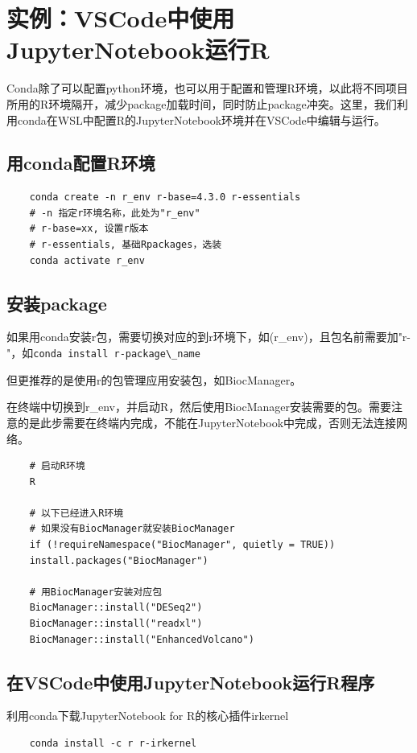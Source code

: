 \section{实例：VSCode中使用JupyterNotebook运行R}
Conda除了可以配置python环境，也可以用于配置和管理R环境，以此将不同项目所用的R环境隔开，减少package加载时间，同时防止package冲突。这里，我们利用conda在WSL中配置R的JupyterNotebook环境并在VSCode中编辑与运行。

\subsection{用conda配置R环境}
\begin{lstlisting}
    conda create -n r_env r-base=4.3.0 r-essentials
    # -n 指定r环境名称，此处为"r_env"
    # r-base=xx, 设置r版本
    # r-essentials, 基础Rpackages，选装
    conda activate r_env
\end{lstlisting}

\subsection{安装package}
如果用conda安装r包，需要切换对应的到r环境下，如(r\_env)，且包名前需要加"r-"，如\lstinline{conda install r-package\_name}

但更推荐的是使用r的包管理应用安装包，如BiocManager。

在终端中切换到r\_env，并启动R，然后使用BiocManager安装需要的包。需要注意的是此步需要在终端内完成，不能在JupyterNotebook中完成，否则无法连接网络。

\begin{lstlisting}
    # 启动R环境
    R

    # 以下已经进入R环境
    # 如果没有BiocManager就安装BiocManager
    if (!requireNamespace("BiocManager", quietly = TRUE))
    install.packages("BiocManager")

    # 用BiocManager安装对应包
    BiocManager::install("DESeq2")
    BiocManager::install("readxl")
    BiocManager::install("EnhancedVolcano")
\end{lstlisting}

\subsection{在VSCode中使用JupyterNotebook运行R程序}
利用conda下载JupyterNotebook for R的核心插件irkernel

\begin{lstlisting}
    conda install -c r r-irkernel
\end{lstlisting}

